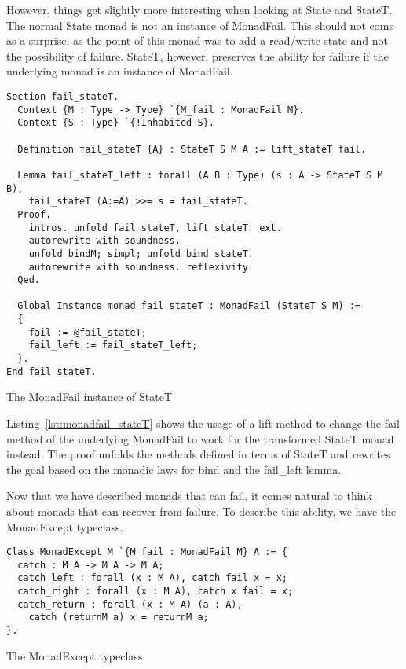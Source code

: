 However, things get slightly more interesting when looking at State and StateT.
The normal State monad is not an instance of MonadFail. This should not come as
a surprise, as the point of this monad was to add a read/write state and not
the possibility of failure. StateT, however, preserves the ability for failure
if the underlying monad is an instance of MonadFail.

\begin{listing}
\begin{verbatim}
Section fail_stateT.
  Context {M : Type -> Type} `{M_fail : MonadFail M}.
  Context {S : Type} `{!Inhabited S}.

  Definition fail_stateT {A} : StateT S M A := lift_stateT fail.

  Lemma fail_stateT_left : forall (A B : Type) (s : A -> StateT S M B),
    fail_stateT (A:=A) >>= s = fail_stateT.
  Proof.
    intros. unfold fail_stateT, lift_stateT. ext. 
    autorewrite with soundness. 
    unfold bindM; simpl; unfold bind_stateT. 
    autorewrite with soundness. reflexivity.
  Qed.

  Global Instance monad_fail_stateT : MonadFail (StateT S M) :=
  {
    fail := @fail_stateT;
    fail_left := fail_stateT_left;
  }.
End fail_stateT.
\end{verbatim}
\caption{The MonadFail instance of StateT}
\label{lst:monadfail_stateT}
\end{listing}

Listing~\ref{lst:monadfail_stateT} shows the usage of a lift method to change
the fail method of the underlying MonadFail to work for the transformed StateT
monad instead. The proof unfolds the methods defined in terms of StateT and
rewrites the goal based on the monadic laws for bind and the fail\_left lemma.

Now that we have described monads that can fail, it comes natural to think
about monads that can recover from failure. To describe this ability, we have
the MonadExcept typeclass.

\begin{listing}
\begin{verbatim}
Class MonadExcept M `{M_fail : MonadFail M} A := {
  catch : M A -> M A -> M A;
  catch_left : forall (x : M A), catch fail x = x;
  catch_right : forall (x : M A), catch x fail = x;
  catch_return : forall (x : M A) (a : A),
    catch (returnM a) x = returnM a;
}.
\end{verbatim}
\caption{The MonadExcept typeclass}
\label{lst:monadexcept}
\end{listing}

